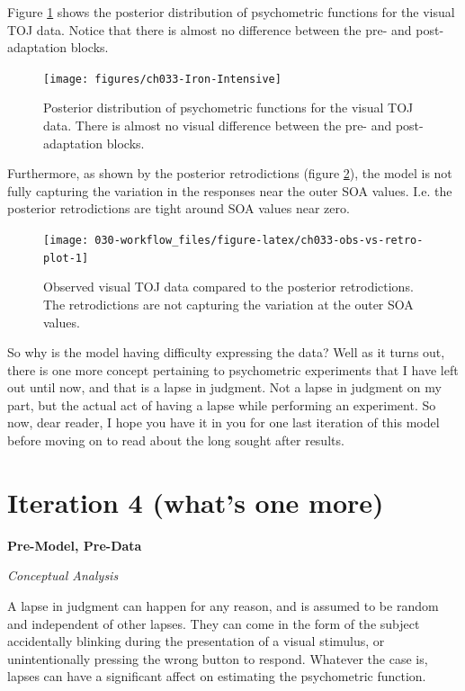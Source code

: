 \documentclass[11pt, oneside, openany]{scrbook}
\begin{document}
Figure \ref{fig:ch033-Iron-Intensive} shows the posterior distribution of psychometric functions for the visual TOJ data. Notice that there is almost no difference between the pre- and post-adaptation blocks.

\begin{figure}

{\centering \texttt{[image: figures/ch033-Iron-Intensive]} 

}

\caption{Posterior distribution of psychometric functions for the visual TOJ data. There is almost no visual difference between the pre- and post-adaptation blocks.}\label{fig:ch033-Iron-Intensive}
\end{figure}

Furthermore, as shown by the posterior retrodictions (figure \ref{fig:ch033-obs-vs-retro-plot}), the model is not fully capturing the variation in the responses near the outer SOA values. I.e. the posterior retrodictions are tight around SOA values near zero.

\begin{figure}

{\centering \texttt{[image: 030-workflow\_files/figure-latex/ch033-obs-vs-retro-plot-1]} 

}

\caption{Observed visual TOJ data compared to the posterior retrodictions. The retrodictions are not capturing the variation at the outer SOA values.}\label{fig:ch033-obs-vs-retro-plot}
\end{figure}

So why is the model having difficulty expressing the data? Well as it turns out, there is one more concept pertaining to psychometric experiments that I have left out until now, and that is a lapse in judgment. Not a lapse in judgment on my part, but the actual act of having a lapse while performing an experiment. So now, dear reader, I hope you have it in you for one last iteration of this model before moving on to read about the long sought after results.

\hypertarget{iter4}{%
\section{Iteration 4 (what's one more)}\label{iter4}}

\textbf{Pre-Model, Pre-Data}

\emph{Conceptual Analysis}

A lapse in judgment can happen for any reason, and is assumed to be random and independent of other lapses. They can come in the form of the subject accidentally blinking during the presentation of a visual stimulus, or unintentionally pressing the wrong button to respond. Whatever the case is, lapses can have a significant affect on estimating the psychometric function.
\end{document}

